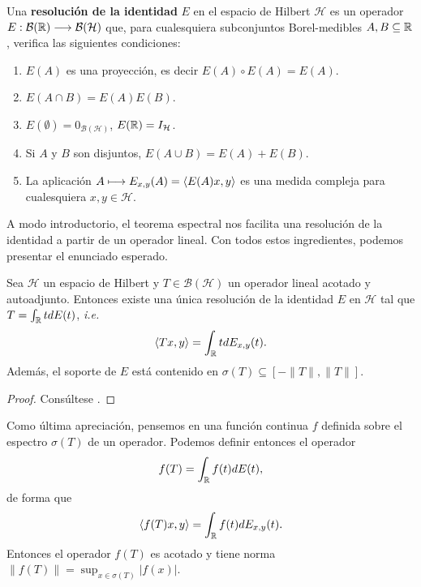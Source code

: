     \begin{definicion}
        \label{def:resolucion-identidad}
        Una \textbf{resolución de la identidad} $E$ en el espacio de Hilbert $\mathcal{H}$ es un operador $E:\mathcal{B}(\mathbb{R})\longrightarrow\mathcal{B}(\mathcal{H})$ que, para cualesquiera subconjuntos Borel-medibles $A,B\subseteq \mathbb{R}$, verifica las siguientes condiciones:
        \begin{enumerate}
            \item $E(A)$ es una proyección, es decir $E(A)\circ E(A)=E(A)$.
            \item $E(A\cap B)=E(A)E(B)$.
            \item $E(\emptyset)=0_{\mathcal{B}(\mathcal{H})}$, $E(\mathbb{R})=I_\mathcal{H}$.
            \item Si $A$ y $B$ son disjuntos, $E(A\cup B)=E(A)+E(B)$.
            \item La aplicación $A\longmapsto E_{x,y}(A)=\left\langle E(A)x , y \right\rangle$ es una medida compleja para cualesquiera $x,y\in\mathcal{H}$.
        \end{enumerate}
    \end{definicion}

    A modo introductorio, el teorema espectral nos facilita una resolución de la identidad a partir de un operador lineal. Con todos estos ingredientes, podemos presentar el enunciado esperado.

    \begin{teorema}
        \label{th:espectral}

        Sea $\mathcal{H}$ un espacio de Hilbert y $T\in\mathcal{B}(\mathcal{H})$ un operador lineal acotado y autoadjunto. Entonces existe una única resolución de la identidad $E$ en $\mathcal{H}$ tal que $T=\int_{\mathbb{R}} t dE(t)$, \textit{i.e.}
        \begin{equation}
            \label{eq:teorema-espectral}
            \left\langle Tx , y \right\rangle = \int_{\mathbb{R}} t dE_{x,y}(t).
        \end{equation}
        Además, el soporte de $E$ está contenido en $\sigma(T)\subseteq[-\|T\|,\|T\|]$.
    \end{teorema}
    \begin{proof}
        Consúltese \cite[Theorem 12.22]{rudin}.
    \end{proof}

    Como última apreciación, pensemos en una función continua $f$ definida sobre el espectro $\sigma(T)$ de un operador. Podemos definir entonces el operador
    $$
    f(T)=\int_{\mathbb{R}} f(t) dE(t),
    $$
    de forma que
    $$
    \left\langle f(T)x , y \right\rangle=\int_{\mathbb{R}} f(t)d E_{x,y}(t).
    $$
    Entonces el operador $f(T)$ es acotado y tiene norma $\|f(T)\|=\displaystyle\sup_{x\in\sigma(T)}|f(x)|$.

    